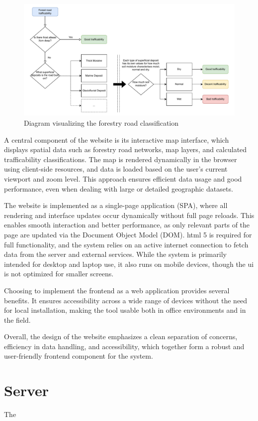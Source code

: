 \begin{figure}[h]
    \centering
    \centerline{\includegraphics[width=1.2\linewidth]{figures/roadclassification.pdf}}
    \caption{Diagram visualizing the forestry road classification}
    \label{fig:forestryroadclassification}
\end{figure}

A central component of the website is its interactive map interface, which displays spatial data such as forestry road networks, map layers, and calculated trafficability classifications. The map is rendered dynamically in the browser using client-side resources, and data is loaded based on the user’s current viewport and zoom level. This approach ensures efficient data usage and good performance, even when dealing with large or detailed geographic datasets.

The website is implemented as a single-page application (SPA), where all rendering and interface updates occur dynamically without full page reloads. This enables smooth interaction and better performance, as only relevant parts of the page are updated via the Document Object Model (DOM). \acrshort{html} 5 is required for full functionality, and the system relies on an active internet connection to fetch data from the server and external services. While the system is primarily intended for desktop and laptop use, it also runs on mobile devices, though the \acrshort{ui} is not optimized for smaller screens.

Choosing to implement the frontend as a web application provides several benefits. It ensures accessibility across a wide range of devices without the need for local installation, making the tool usable both in office environments and in the field.

Overall, the design of the website emphasizes a clean separation of concerns, efficiency in data handling, and accessibility, which together form a robust and user-friendly frontend component for the system.

\section{Server}

The 




